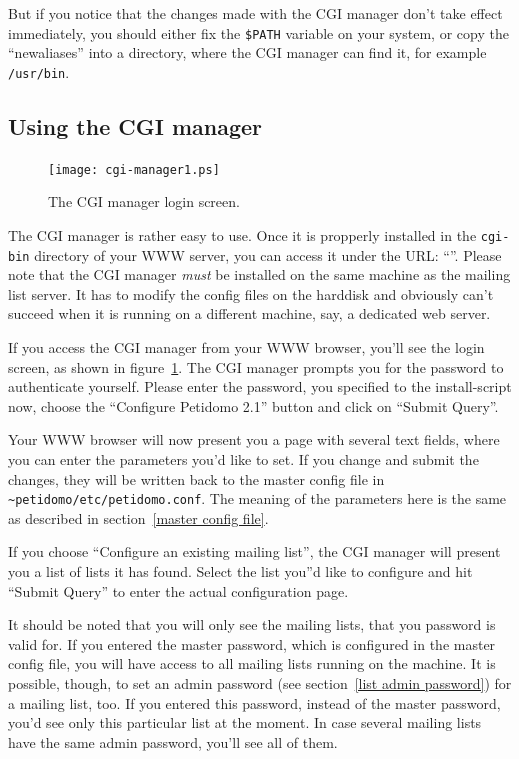 \documentclass[a4paper]{report}
\newcommand{\file}[1]{{\tt #1}}
\begin{document}
But if you notice that the changes made with the CGI manager don't
take effect immediately, you should either fix the {\tt \$PATH}
variable on your system, or copy the ``newaliases'' into a directory,
where the CGI manager can find it, for example \file{/usr/bin}.

\subsection{Using the CGI manager}
\label{using the cgi manager}

\begin{figure}[bth]
\begin{center}
\texttt{[image: cgi-manager1.ps]}
\caption{The CGI manager login screen.}
\label{cgiman login}
\end{center}
\end{figure}

The CGI manager is rather easy to use. Once it is propperly installed
in the \file{cgi-bin} directory of your WWW server, you can access it
under the URL:
``''.
Please note that the CGI manager \emph{must} be installed on the same
machine as the mailing list server. It has to modify the config files
on the harddisk and obviously can't succeed when it is running on a
different machine, say, a dedicated web server.

If you access the CGI manager from your WWW browser, you'll see the
login screen, as shown in figure~\ref{cgiman login}. The CGI manager
prompts you for the password to authenticate yourself. Please enter
the password, you specified to the install-script now, choose the
``Configure Petidomo 2.1'' button and click on ``Submit Query''.

Your WWW browser will now present you a page with several text fields,
where you can enter the parameters you'd like to set. If you change
and submit the changes, they will be written back to the master config
file in \file{\~{}petidomo/etc/petidomo.conf}. The meaning of the
parameters here is the same as described in section~\ref{master config
file}.

If you choose ``Configure an existing mailing list'', the CGI manager
will present you a list of lists it has found. Select the list you''d
like to configure and hit ``Submit Query'' to enter the actual
configuration page.

It should be noted that you will only see the mailing lists, that you
password is valid for. If you entered the master password, which is
configured in the master config file, you will have access to all
mailing lists running on the machine. It is possible, though, to set
an admin password (see section~\ref{list admin password}) for a
mailing list, too. If you entered this password, instead of the master
password, you'd see only this particular list at the moment. In case
several mailing lists have the same admin password, you'll see all of
them.
\end{document}
